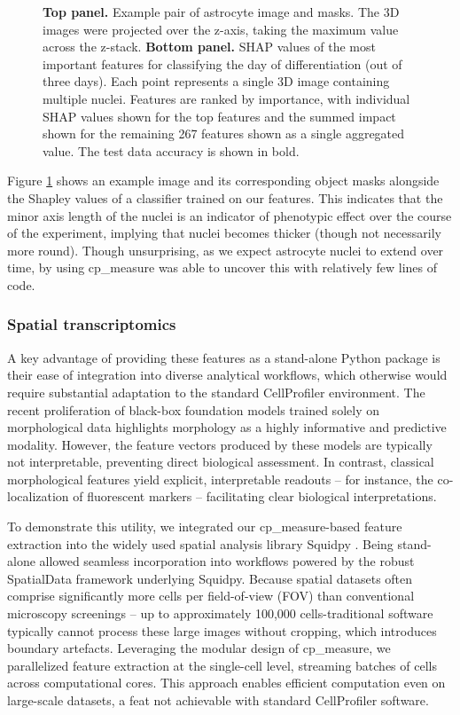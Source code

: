 \documentclass{article}
\begin{document}
\begin{figure}[htbp]
\centering

\caption{\label{fig:astrocytes}\textbf{Top panel.} Example pair of astrocyte image and masks. The 3D images were projected over the z-axis, taking the maximum value across the z-stack. \textbf{Bottom panel.} SHAP values of the most important features for classifying the day of differentiation (out of three days). Each point represents a single 3D image containing multiple nuclei. Features are ranked by importance, with individual SHAP values shown for the top features and the summed impact shown for the remaining 267 features shown as a single aggregated value. The test data accuracy is shown in bold.}
\end{figure}

Figure \ref{fig:astrocytes} shows an example image and its corresponding object masks alongside the Shapley values of a classifier trained on our features. This indicates that the minor axis length of the nuclei is an indicator of phenotypic effect over the course of the experiment, implying that nuclei becomes thicker (though not necessarily more round). Though unsurprising, as we expect astrocyte nuclei to extend over time, by using cp\_measure was able to uncover this with relatively few lines of code.
\subsubsection{Spatial transcriptomics}
\label{sec:org5711d86}
A key advantage of providing these features as a stand-alone Python package is their ease of integration into diverse analytical workflows, which otherwise would require substantial adaptation to the standard CellProfiler environment. The recent proliferation of black-box foundation models trained solely on morphological data highlights morphology as a highly informative and predictive modality. However, the feature vectors produced by these models are typically not interpretable, preventing direct biological assessment. In contrast, classical morphological features yield explicit, interpretable readouts -- for instance, the co-localization of fluorescent markers -- facilitating clear biological interpretations.

To demonstrate this utility, we integrated our cp\_measure-based feature extraction into the widely used spatial analysis library Squidpy \citep{pallaSquidpyScalableFramework2022}. Being stand-alone allowed seamless incorporation into workflows powered by the robust SpatialData \citep{marconatoSpatialDataOpenUniversal2025} framework underlying Squidpy. Because spatial datasets often comprise significantly more cells per field-of-view (FOV) than conventional microscopy screenings -- up to approximately 100,000 cells-traditional software typically cannot process these large images without cropping, which introduces boundary artefacts. Leveraging the modular design of cp\_measure, we parallelized feature extraction at the single-cell level, streaming batches of cells across computational cores. This approach enables efficient computation even on large-scale datasets, a feat not achievable with standard CellProfiler software.
\end{document}
